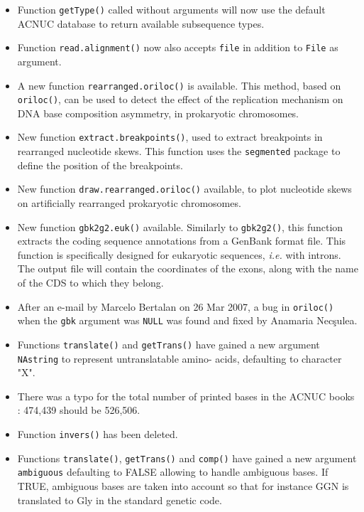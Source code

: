 \documentclass{article}
\begin{document}
\begin{itemize}
\item Function \texttt{getType()} called without arguments will now use
the default ACNUC database to return available subsequence types.

\item Function \texttt{read.alignment()} now also accepts \texttt{file} in
addition to \texttt{File} as argument.

\item A new function \texttt{rearranged.oriloc()} is available. This
method, based on \texttt{oriloc()}, can be used to detect the effect of
the replication mechanism on DNA base composition asymmetry, in
prokaryotic chromosomes.

\item New function \texttt{extract.breakpoints()}, used to extract
breakpoints in rearranged nucleotide skews. This function uses the
\texttt{segmented} package to define the position of the breakpoints.

\item New function \texttt{draw.rearranged.oriloc()} available, to plot
nucleotide skews on artificially rearranged prokaryotic chromosomes.

\item New function \texttt{gbk2g2.euk()} available. Similarly to 
\texttt{gbk2g2()}, this function extracts the coding sequence annotations
from a GenBank format file. This function is specifically designed for
eukaryotic sequences, \textit{i.e.} with introns. The output file will contain
the coordinates of the exons, along with the name of the CDS to which
they belong.

\item After an e-mail by Marcelo Bertalan on 26 Mar 2007, a bug in
\texttt{oriloc()} when the \texttt{gbk} argument was \texttt{NULL}
was found and fixed by Anamaria Nec\c{s}ulea.

\item Functions \texttt{translate()} and \texttt{getTrans()} have gained
a new argument \texttt{NAstring} to represent untranslatable amino-
acids, defaulting to character "X".

\item There was a typo for the total number of printed bases in
the ACNUC books \cite{GautierC1982a, GautierC1982b} : 474,439 should be 526,506.

\item Function \texttt{invers()} has been deleted.

\item Functions \texttt{translate()}, \texttt{getTrans()} and \texttt{comp()} have gained a 
new argument \texttt{ambiguous} defaulting to FALSE allowing to handle 
ambiguous bases. If TRUE, ambiguous bases are taken into account so that 
for instance GGN is translated to Gly in the standard genetic code.


\end{itemize}
\end{document}
